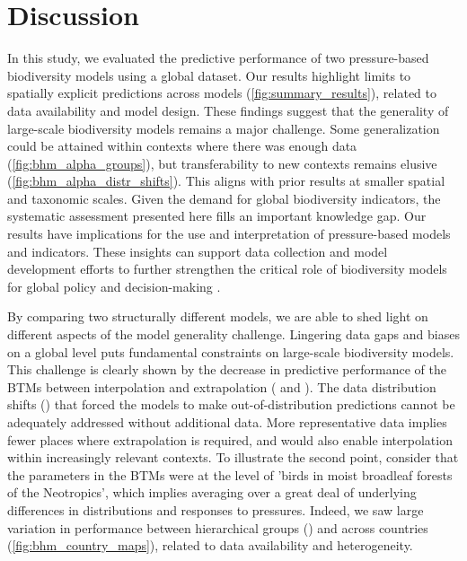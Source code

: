 
\section*{Discussion}

In this study, we evaluated the predictive performance of two pressure-based biodiversity models using a global dataset. Our results highlight limits to spatially explicit predictions across models (\autoref{fig:summary_results}), related to data availability and model design. These findings suggest that the generality of large-scale biodiversity models remains a major challenge\cite{spake2022}. Some generalization could be attained within contexts where there was enough data (\autoref{fig:bhm_alpha_groups}), but transferability to new contexts remains elusive (\autoref{fig:bhm_alpha_distr_shifts}). This aligns with prior results at smaller spatial and taxonomic scales\cite{roberts2017,meyer2021,meyer2022}. Given the demand for global biodiversity indicators\cite{burgess2024}, the systematic assessment presented here fills an important knowledge gap. Our results have implications for the use and interpretation of pressure-based models and indicators. These insights can support data collection and model development efforts to further strengthen the critical role of biodiversity models for global policy and decision-making \cite{zurell2025, purvis2025}.

By comparing two structurally different models, we are able to shed light on different aspects of the model generality challenge. Lingering data gaps and biases on a global level \cite{hughes2021,chapman2024} puts fundamental constraints on large-scale biodiversity models. This challenge is clearly shown by the decrease in predictive performance of the BTMs between interpolation and extrapolation ( and ). The data distribution shifts () that forced the models to make out-of-distribution predictions cannot be adequately addressed without additional data. More representative data implies fewer places where extrapolation is required, and would also enable interpolation within increasingly relevant contexts. To illustrate the second point, consider that the parameters in the BTMs were at the level of 'birds in moist broadleaf forests of the Neotropics', which implies averaging over a great deal of underlying differences in distributions and responses to pressures. Indeed, we saw large variation in performance between hierarchical groups () and across countries (\autoref{fig:bhm_country_maps}), related to data availability and heterogeneity.

